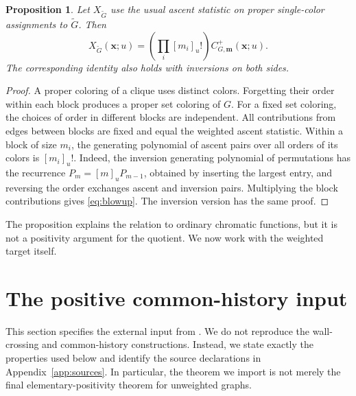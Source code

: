 \documentclass[11pt,reqno]{amsart}
\newcommand{\xx}{\mathbf x}
\newcommand{\mm}{\mathbf m}
\newtheorem{proposition}[theorem]{Proposition}
\theoremstyle{definition}
\theoremstyle{remark}
\numberwithin{equation}{section}
\begin{document}
\begin{proposition}\label{prop:blowup}
Let $X_{\widetilde G}$ use the usual ascent statistic on proper
single-color assignments to $\widetilde G$.  Then
\begin{equation}\label{eq:blowup}
 X_{\widetilde G}(\xx;u)
 =\left(\prod_i[m_i]_u!\right)C^+_{G,\mm}(\xx;u).
\end{equation}
The corresponding identity also holds with inversions on both sides.
\end{proposition}
\begin{proof}
A proper coloring of a clique uses distinct colors.  Forgetting their
order within each block produces a proper set coloring of $G$.
For a fixed set coloring, the choices of order in different blocks are
independent.  All contributions from edges between blocks are fixed
and equal the weighted ascent statistic.  Within a block of size $m_i$,
the generating polynomial of ascent pairs over all orders of its
colors is $[m_i]_u!$.  Indeed, the inversion generating polynomial of
permutations has the recurrence $P_m=[m]_uP_{m-1}$, obtained by inserting
the largest entry, and reversing the order exchanges ascent and
inversion pairs.  Multiplying the block contributions gives
\eqref{eq:blowup}.  The inversion version has the same proof.
\end{proof}

The proposition explains the relation to ordinary chromatic functions,
but it is not a positivity argument for the quotient.  We now work with
the weighted target itself.

\section{The positive common-history input}\label{sec:input}

This section specifies the external input from
\cite{OpenAI2026,OpenAILean2026}.  We do not reproduce the wall-crossing
and common-history constructions.  Instead, we state exactly the
properties used below and identify the source declarations in
Appendix~\ref{app:sources}.  In particular, the theorem we import is not
merely the final elementary-positivity theorem for unweighted graphs.
\end{document}
